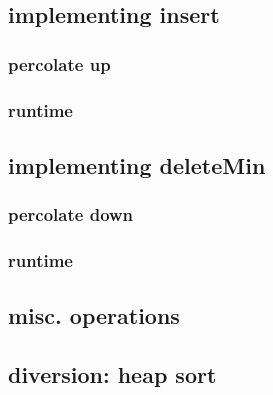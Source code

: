 

\subsection{implementing insert}



\subsubsection{percolate up}




\subsubsection{runtime}





\subsection{implementing deleteMin}



\subsubsection{percolate down}




\subsubsection{runtime}



\subsection{misc. operations}



\subsection{diversion: heap sort}



